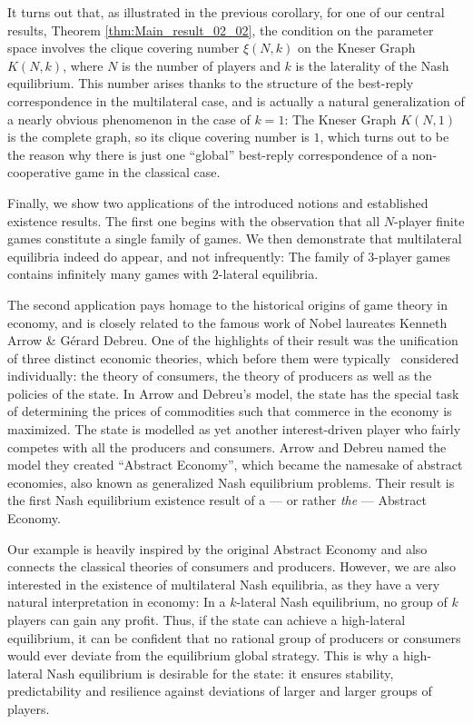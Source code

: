 \documentclass[a4paper,11pt,reqno,english]{amsart}
\theoremstyle{plain}
\theoremstyle{definition}
\begin{document}
\medskip
It turns out that, as illustrated in the previous corollary, for one of our central results, Theorem \ref{thm:Main_result_02_02}, the condition on the parameter space involves the clique covering number $\xi(N,k)$ on the Kneser Graph $K(N,k)$, where $N$ is the number of players and $k$ is the laterality of the Nash equilibrium. 
This number arises thanks to the structure of the best-reply correspondence in the multilateral case, and is actually a natural generalization of a nearly obvious phenomenon in the case of $k=1$: The Kneser Graph $K(N,1)$ is the complete graph, so its clique covering number is $1$, which turns out to be the reason why there is just one ``global'' best-reply correspondence of a non-cooperative game in the classical case.

\medskip
Finally, we show two applications of the introduced notions and established existence results.
The first one begins with the observation that all $N$-player finite games constitute a single family of games. 
We then demonstrate that multilateral equilibria indeed do appear, and not infrequently: The family of $3$-player games contains infinitely many games with $2$-lateral equilibria. 

\medskip
The second application pays homage to the historical origins of game theory in economy, and is closely related to the famous work of Nobel laureates Kenneth Arrow \& G\'erard Debreu. 
One of the highlights of their result was the unification of three distinct economic theories, which before them were typically~\cite{HendersonQuandt1958, Baumol1965} considered individually: the theory of consumers, the theory of producers as well as the policies of the state. 
In Arrow and Debreu's model, the state has the special task of determining the prices of commodities such that commerce in the economy is maximized. 
The state is modelled as yet another interest-driven player who fairly competes with all the producers and consumers. Arrow and Debreu named the model they created ``Abstract Economy'', which became the namesake of abstract economies, also known as generalized Nash equilibrium problems. 
Their result is the first Nash equilibrium existence result of a --- or rather \textit{the} --- Abstract Economy.

\medskip
Our example is heavily inspired by the original Abstract Economy and also connects the classical theories of consumers and producers. 
However, we are also interested in the existence of multilateral Nash equilibria, as they have a very natural interpretation in economy: In a $k$-lateral Nash equilibrium, no group of $k$ players can gain any profit. 
Thus, if the state can achieve a high-lateral equilibrium, it can be confident that no rational group of producers or consumers would ever deviate from the equilibrium global strategy. 
This is why a high-lateral Nash equilibrium is desirable for the state: it ensures stability, predictability and resilience against deviations of larger and larger groups of players.
\end{document}
